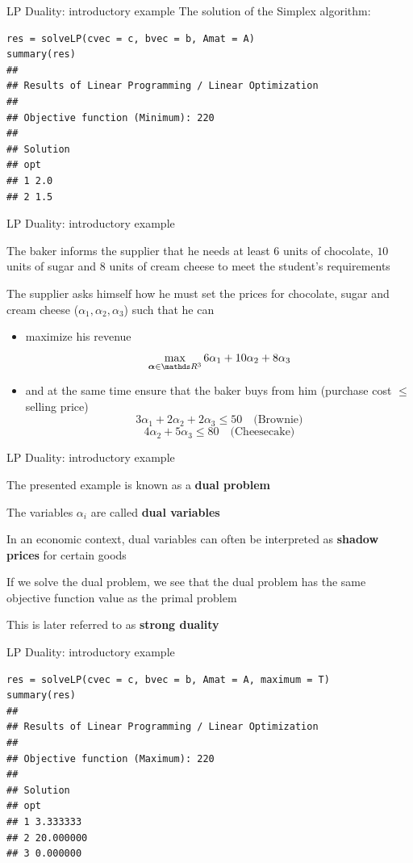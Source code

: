 \documentclass[11pt,compress,t,notes=noshow, xcolor=table]{beamer}
\begin{document}
\begin{frame}[fragile]{LP Duality: introductory example}
\vfill
The solution of the Simplex algorithm:
\footnotesize
\begin{verbatim}
res = solveLP(cvec = c, bvec = b, Amat = A)
summary(res)
##
## Results of Linear Programming / Linear Optimization
##
## Objective function (Minimum): 220
##
## Solution
## opt
## 1 2.0
## 2 1.5
\end{verbatim}
\end{frame}


\begin{framei}{LP Duality: introductory example}
\item The baker informs the supplier that he needs at least $6$ units of chocolate, $10$ units of sugar and $8$ units of cream cheese to meet the student's requirements
\vfill
\item The supplier asks himself how he must set the prices for chocolate, sugar and cream cheese ($\alpha_1, \alpha_2, \alpha_3$) such that he can
\begin{itemize}
\item maximize his revenue
$$\max_{\bm{\alpha} \in \R^3}6 \alpha_1 + 10 \alpha_2 + 8 \alpha_3$$
\item and at the same time ensure that the baker buys from him (purchase cost $\le$ selling price)
$$3\alpha_1 + 2\alpha_2 + 2\alpha_3 \le 50 \quad \text{(Brownie)}$$
$$4\alpha_2 + 5\alpha_3 \le 80 \quad \text{(Cheesecake)}$$
\end{itemize}
\end{framei}


\begin{framei}{LP Duality: introductory example}
\item The presented example is known as a \textbf{dual problem}
\item The variables $\alpha_i$ are called \textbf{dual variables}
\vfill
\item In an economic context, dual variables can often be interpreted as \textbf{shadow prices} for certain goods
\vfill
\item If we solve the dual problem, we see that the dual problem has the same objective function value as the primal problem
\item This is later referred to as \textbf{strong duality}
\end{framei}


\begin{frame}[fragile]{LP Duality: introductory example}
\vfill\footnotesize
\begin{verbatim}
res = solveLP(cvec = c, bvec = b, Amat = A, maximum = T)
summary(res)
##
## Results of Linear Programming / Linear Optimization
##
## Objective function (Maximum): 220
##
## Solution
## opt
## 1 3.333333
## 2 20.000000
## 3 0.000000
\end{verbatim}
\end{frame}
\end{document}
